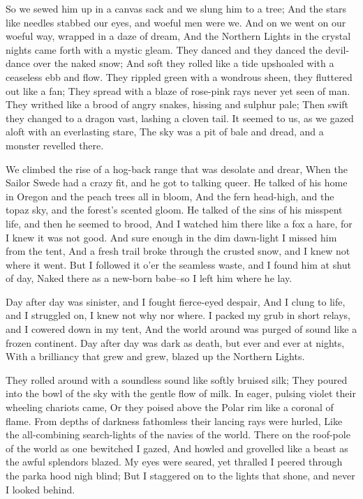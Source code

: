 \begin{poemblock}
 So we sewed him up in a canvas sack and we slung him to a tree;
 And the stars like needles stabbed our eyes, and woeful men were we.
 And on we went on our woeful way, wrapped in a daze of dream,
 And the Northern Lights in the crystal nights
   came forth with a mystic gleam.
 They danced and they danced the devil-dance over the naked snow;
 And soft they rolled like a tide upshoaled with a ceaseless ebb and flow.
 They rippled green with a wondrous sheen, they fluttered out like a fan;
 They spread with a blaze of rose-pink rays never yet seen of man.
 They writhed like a brood of angry snakes, hissing and sulphur pale;
 Then swift they changed to a dragon vast, lashing a cloven tail.
 It seemed to us, as we gazed aloft with an everlasting stare,
 The sky was a pit of bale and dread, and a monster revelled there.

 We climbed the rise of a hog-back range that was desolate and drear,
 When the Sailor Swede had a crazy fit, and he got to talking queer.
 He talked of his home in Oregon and the peach trees all in bloom,
 And the fern head-high, and the topaz sky, and the forest's scented gloom.
 He talked of the sins of his misspent life, and then he seemed to brood,
 And I watched him there like a fox a hare, for I knew it was not good.
 And sure enough in the dim dawn-light I missed him from the tent,
 And a fresh trail broke through the crusted snow,
   and I knew not where it went.
 But I followed it o'er the seamless waste, and I found him at shut of day,
 Naked there as a new-born babe--so I left him where he lay.

 Day after day was sinister, and I fought fierce-eyed despair,
 And I clung to life, and I struggled on, I knew not why nor where.
 I packed my grub in short relays, and I cowered down in my tent,
 And the world around was purged of sound like a frozen continent.
 Day after day was dark as death, but ever and ever at nights,
 With a brilliancy that grew and grew, blazed up the Northern Lights.

 They rolled around with a soundless sound like softly bruised silk;
 They poured into the bowl of the sky with the gentle flow of milk.
 In eager, pulsing violet their wheeling chariots came,
 Or they poised above the Polar rim like a coronal of flame.
 From depths of darkness fathomless their lancing rays were hurled,
 Like the all-combining search-lights of the navies of the world.
 There on the roof-pole of the world as one bewitched I gazed,
 And howled and grovelled like a beast as the awful splendors blazed.
 My eyes were seared, yet thralled I peered
   through the parka hood nigh blind;
 But I staggered on to the lights that shone, and never I looked behind.


\end{poemblock}
